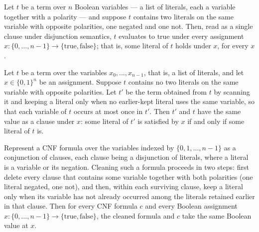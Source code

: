 \begin{lemma}
\label{LMN.contradiction_clause_eval_true}
\leanok
{}
Let $t$ be a term over $n$ Boolean variables — a list of literals, each a variable
together with a polarity — and suppose $t$ contains two literals on the same variable
with opposite polarities, one negated and one not. Then, read as a single clause under
disjunction semantics, $t$ evaluates to true under every assignment $x : \{0,\dots,n-1\}
\to \{\mathrm{true},\mathrm{false}\}$; that is, some literal of $t$ holds under $x$, for
every $x$.
\end{lemma}

\begin{lemma}
\label{LMN.dedupTermVar_preserves_clause_eval}
\leanok
{}
Let $t$ be a term over the variables $x_0,\dots,x_{n-1}$, that is, a list of literals,
and let $x \in \{0,1\}^n$ be an assignment. Suppose $t$ contains no two literals on the
same variable with opposite polarities. Let $t'$ be the term obtained from $t$ by
scanning it and keeping a literal only when no earlier-kept literal uses the same
variable, so that each variable of $t$ occurs at most once in $t'$. Then $t'$ and $t$
have the same value as a clause under $x$: some literal of $t'$ is satisfied by $x$ if
and only if some literal of $t$ is.
\end{lemma}

\begin{lemma}
\label{LMN.cleanCNF_eval}
\leanok
{}
Represent a CNF formula over the variables indexed by $\{0,1,\dots,n-1\}$ as a
conjunction of clauses, each clause being a disjunction of literals, where a literal is
a variable or its negation. Cleaning such a formula proceeds in two steps: first delete
every clause that contains some variable together with both polarities (one literal
negated, one not), and then, within each surviving clause, keep a literal only when its
variable has not already occurred among the literals retained earlier in that clause.
Then for every CNF formula $c$ and every Boolean assignment $x \colon
\{0,\dots,n-1\}\to\{\mathrm{true},\mathrm{false}\}$, the cleaned formula and $c$ take
the same Boolean value at $x$.
\end{lemma}

